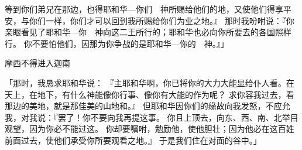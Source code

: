 {等到你们弟兄在{}那边，也得耶和华—你们　神所赐给他们的地，又使他们得享平安，与你们一样，你们才可以回到我所赐给你们为业之地。』
那时我吩咐{}说：『你亲眼看见了耶和华—你　神向这二王所行的；耶和华也必向你所要去的各国照样行。
你不要怕他们，因那为你争战的是耶和华—你的　神。』」
\par }{\SH 摩西不得进入迦南
\par }{\PP {}「那时，我恳求耶和华说：
『主耶和华啊，你已将你的大力大能显给仆人看。在天上，在地下，有什么神能像你行事、像你有大能的作为呢？
求你容我过去，看{}那边的美地，就是那佳美的山地和{}。』
但耶和华因你们的缘故向我发怒，不应允我，对我说：『罢了！你不要向我再提这事。
你且上{}顶去，向东、西、南、北举目观望，因为你必不能过这{}。
你却要嘱咐{}，勉励他，使他胆壮；因为他必在这百姓前面过去，使他们承受你所要观看之地。』
于是我们住在{}对面的谷中。」

}
